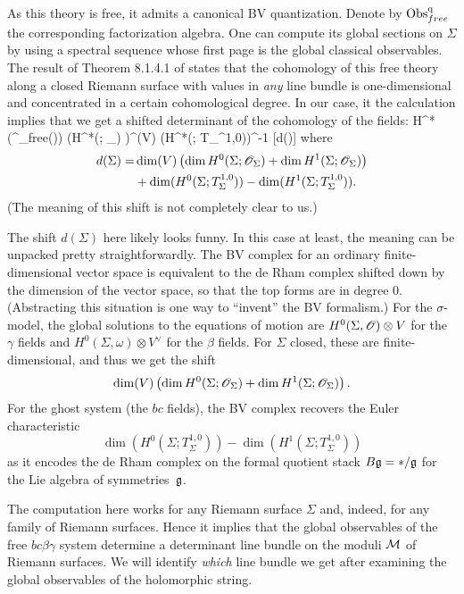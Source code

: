 As this theory is free, it admits a canonical BV quantization.
Denote by ${\rm Obs}^{{\rm q}}_{free}$ the corresponding factorization algebra.
One can compute its global sections on $\Sigma$ by using a spectral sequence whose first page is the global classical observables.
The result of Theorem 8.1.4.1 of \cite{CG1} states that the cohomology of this free theory along a closed Riemann surface with values in {\em any} line bundle is one-dimensional and concentrated in a certain cohomological degree. 
In our case, it the calculation implies that we get a shifted determinant of the cohomology of the fields:
\ben
H^*\left(\Obs^\q_{free}(\Sigma)\right) \cong \det \left(H^*(\Sigma ; \sO_\Sigma) \right)^{\tensor \dim(V)} \tensor \det \left(H^*(\Sigma ; T_\Sigma^{1,0})\right)^{-1} [d(\Sigma)] 
\een
where 
\begin{align*}
d(\Sigma) = & \dim (V)  \left(\dim H^0(\Sigma ; \mathscr O_\Sigma) + \dim H^1(\Sigma ; \mathscr O_\Sigma)\right) \\
&+ \dim(H^0(\Sigma ; T_\Sigma^{1,0})) - \dim(H^1(\Sigma ; T_\Sigma^{1,0})).
\end{align*}
(The meaning of this shift is not completely clear to us.)


\begin{rmk}
The shift $d(\Sigma)$ here likely looks funny.
In this case at least, the meaning can be unpacked pretty straightforwardly. 
The BV complex for an ordinary finite-dimensional vector space is equivalent to the de Rham complex shifted down by the dimension of the vector space, 
so that the top forms are in degree 0.
(Abstracting this situation is one way to ``invent'' the BV formalism.)
For the $\sigma$-model, the global solutions to the equations of motion are $H^0(\Sigma,\mathscr O) \otimes V$ for the $\gamma$ fields and $H^0(\Sigma,\omega) \otimes V^\vee$ for the $\beta$ fields.
For $\Sigma$ closed, these are finite-dimensional, and thus we get the shift
\[
 \dim (V)  \left(\dim H^0(\Sigma ; \mathscr O_\Sigma) + \dim H^1(\Sigma ; \mathscr O_\Sigma)\right).
\]
For the ghost system (the $bc$ fields), 
the BV complex recovers the Euler characteristic 
\[
\dim(H^0(\Sigma ; T_\Sigma^{1,0})) - \dim(H^1(\Sigma ; T_\Sigma^{1,0}))
\]
as it encodes the de Rham complex on the formal quotient stack $B\mathfrak g = \ast/\mathfrak g$ for the Lie algebra of symmetries~$\mathfrak g$.
\end{rmk}

The computation here works for any Riemann surface $\Sigma$ and, indeed, for any family of Riemann surfaces.
Hence it implies that the global observables of the free $bc\beta\gamma$ system determine a determinant line bundle on the moduli $\mathcal M$ of Riemann surfaces.
We will identify {\em which} line bundle we get after examining the global observables of the holomorphic string.

